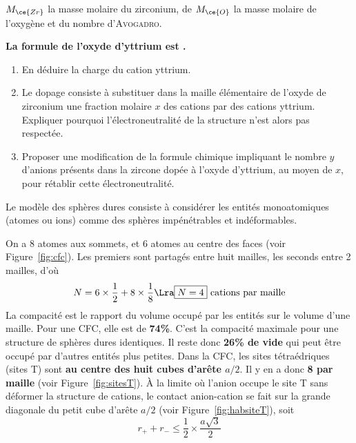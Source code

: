 \documentclass[11pt]{book}
\begin{document}
{\begin{enumerate}[resume]
		      $M_{\ce{Zr}}$ la masse molaire du zirconium, de $M_{\ce{O}}$ la masse
		      molaire de l'oxygène et du nombre d'\textsc{Avogadro}.
	\end{enumerate}
	\textbf{La formule de l'oxyde d'yttrium est .}
	\begin{enumerate}[resume]
		\item En déduire la charge du cation yttrium.
		\item Le dopage consiste à substituer dans la maille élémentaire de l'oxyde de
		      zirconium une fraction molaire $x$ des cations  par des
		      cations yttrium. Expliquer pourquoi l'électroneutralité de la structure
		      n'est alors pas respectée.
		\item Proposer une modification de la formule chimique impliquant le nombre
		      $y$ d'anions  présents dans la zircone dopée à l'oxyde
		      d'yttrium, au moyen de $x$, pour rétablir cette électroneutralité.
	\end{enumerate}
	\newpage
}{
	\begin{enumerate}
		 Le modèle des sphères dures consiste à considérer les entités
		monoatomiques (atomes ou ions) comme des sphères impénétrables et
		indéformables.
	\end{enumerate}
	\vspace*{-10pt}
	\noindent
	\begin{minipage}[t]{.73\linewidth}
		\begin{enumerate}[start=2]
			 On a 8 atomes aux sommets, et 6 atomes au centre des faces (voir
			Figure~\ref{fig:cfc}). Les premiers sont partagés entre huit mailles, les
			seconds entre 2 mailles, d'où
			\[
				N = 6 \times \frac{1}{2} + 8 \times \frac{1}{8}
				\Lra
				\boxed{N = 4} \text{ cations par maille}
			\]
			 La compacité est le rapport du volume occupé par les entités sur
			le volume d'une maille. Pour une CFC, elle est de \textbf{74\%}. C'est la
			compacité maximale pour une structure de sphères dures identiques. Il reste
			donc \textbf{26\% de vide} qui peut être occupé par d'autres entités plus
			petites.
			 Dans la CFC, les sites tétraédriques (sites T) sont \textbf{au
				centre des huit cubes d'arête $a/2$}. Il y en a donc \textbf{8 par maille}
			(voir Figure~\ref{fig:sitesT}).
			 À la limite où l'anion occupe le site T sans déformer la structure
			de cations, le contact anion-cation se fait sur la grande diagonale du petit
			cube d'arête $a/2$ (voir Figure~\ref{fig:habsiteT}), soit
			\[
				r_+ + r_- \leq \frac{1}{2}\times \frac{a \sqrt{3}}{2}
\]
\end{enumerate}
\end{minipage}}
\end{document}
